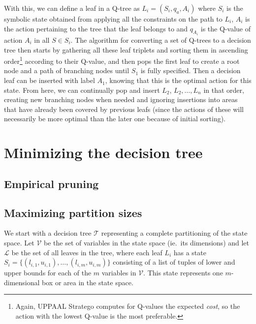 \documentclass{article}
\begin{document}
With this, we can define a leaf in a Q-tree as $L_i = (S_i, q_a, A_i)$ where
$S_i$ is the symbolic state obtained from applying all the constraints on the
path to $L_i$, $A_i$ is the action pertaining to the tree that the leaf belongs
to and $q_{A_i}$ is the Q-value of action $A_i$ in all $S \in S_i$. The
algorithm for converting a set of Q-trees to a decision tree then starts by
gathering all these leaf triplets and sorting them in ascending order\footnote{%
    Again, UPPAAL Stratego computes for Q-values the expected \textit{cost}, so
the action with the lowest Q-value is the most preferable.} according to their
Q-value, and then pops the first leaf to create a root node and a path of
branching nodes until $S_1$ is fully specified. Then a decision leaf can be
inserted with label $A_1$, knowing that this is the optimal action for this
state. From here, we can continually pop and insert $L_2$, $L_2, \ldots, L_n$ in
that order, creating new branching nodes when needed and ignoring insertions
into areas that have already been covered by previous leafs (since the actions
of these will necessarily be more optimal than the later one because of initial
sorting).


\section{Minimizing the decision tree}%
\label{sec:minimizingDT}

\lipsum[1]

\subsection{Empirical pruning}%
\label{subsec:empPruning}

\lipsum[2]

\subsection{Maximizing partition sizes}%
\label{subsec:findBoxes}

We start with a decision tree $\mathcal{T}$ representing a complete
partitioning of the state space. Let $\mathcal{V}$ be the set of variables in
the state space (ie.\ its dimensions) and let $\mathcal{L}$ be the set of all
leaves in the tree, where each leaf $L_{i}$ has a state $S_i =
\{(l_{i,1},u_{i,1}), \ldots, (l_{i,m},u_{i,m})\}$ consisting of a list of tuples
of lower and upper bounds for each of the $m$ variables in $\mathcal{V}$. This
state represents one $m$-dimensional box or area in the state space.
\end{document}
